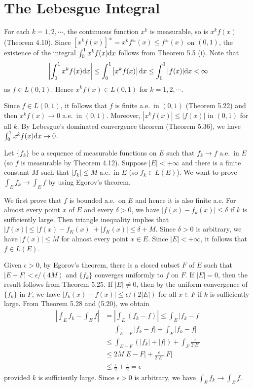 \section{The Lebesgue Integral}

\begin{exercise}{5.4}
  For each $k=1,2,\cdots$, the continuous function $x^k$ is measurable,
  so is $x^kf(x)$ (Theorem 4.10).
  Since $[x^kf(x)]^\pm=x^kf^\pm(x)\leq f^\pm(x)$ on $(0,1)$,
  the existence of the integral $\int_0^1x^kf(x)\mathrm{d} x$ follows from Theorem 5.5 (i).
  Note that
  \[\left|\int_0^1 x^kf(x)\mathrm{d} x\right|\leq\int_0^1\left|x^kf(x)\right|\mathrm{d} x\leq\int_0^1|f(x)|\mathrm{d} x<\infty\]
  as $f\in L(0,1)$.
  Hence $x^kf(x)\in L(0,1)$ for $k=1,2,\cdots$.

  Since $f\in L(0,1)$, it follows that $f$ is finite a.e.\ in $(0,1)$ (Theorem 5.22)
  and then $x^kf(x)\to 0$ a.e.\ in $(0,1)$.
  Moreover, $|x^kf(x)|\leq |f(x)|$ in $(0,1)$ for all $k$.
  By Lebesgue's dominated convergence theorem (Theorem 5.36),
  we have $\int_0^1x^kf(x)\mathrm{d} x\to0$.
\end{exercise}

\begin{exercise}{5.5}
  Let $\{f_k\}$ be a sequence of measurable functions on $E$ such that
  $f_k\to f$ a.e.\ in $E$ (so $f$ is measurable by Theorem 4.12).
  Suppose $|E|<+\infty$ and there is a finite constant $M$
  such that $|f_k|\leq M$ a.e.\ in $E$ (so $f_k\in L(E)$).
  We want to prove $\int_Ef_k\to \int_E f$ by using Egorov's theorem.

  We first prove that $f$ is bounded a.e.\ on $E$ and hence it is also finite a.e.
  For almost every point $x$ of $E$ and every $\delta>0$,
  we have $|f(x)-f_k(x)|\leq\delta$ if $k$ is sufficiently large.
  Then triangle inequality implies that $|f(x)|\leq|f(x)-f_K(x)|+|f_K(x)|\leq \delta+M$.
  Since $\delta>0$ is arbitrary,
  we have $|f(x)|\leq M$ for almost every point $x\in E$.
  Since $|E|<+\infty$, it follows that $f\in L(E)$.

  Given $\epsilon>0$, by Egorov's theorem,
  there is a closed subset $F$ of $E$ such that
  $|E-F|<\epsilon/(4M)$ and $\{f_k\}$ converges uniformly to $f$ on $F$.
  If $|E|=0$, then the result follows from Theorem 5.25.
  If $|E|\neq 0$, then by the uniform convergence of $\{f_k\}$ in $F$,
  we have $|f_k(x)-f(x)|\leq \epsilon/(2|E|)$ for all $x\in F$ if $k$ is sufficiently large.
  From Theorem 5.28 and (5.20), we obtain
  \begin{equation*}
    \begin{aligned}
      \left|\int_E f_k-\int_Ef\right|&=	\left|\int_E (f_k-f)\right|\leq \int_E|f_k-f|\\&=\int_{E-F}|f_k-f|+\int_F|f_k-f|\\&\leq\int_{E-F}(|f_k|+|f|)+\int_F\frac{\epsilon}{2|E|}\\
      &\leq 2M|E-F|+\frac{\epsilon}{2|E|}|F|\\&\leq\frac{\epsilon}{2}+\frac{\epsilon}{2}=\epsilon
    \end{aligned}
  \end{equation*}
  provided $k$ is sufficiently large.
  Since $\epsilon>0$ is arbitrary, we have $\int_Ef_k\to \int_E f$.
\end{exercise}

